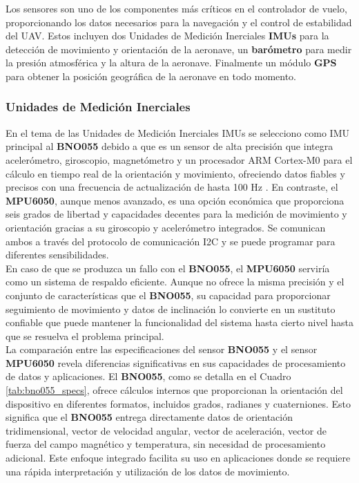     Los sensores son uno de los componentes más críticos en el controlador de vuelo, proporcionando los datos necesarios para la navegación y el control de estabilidad del UAV. Estos incluyen dos Unidades de Medición Inerciales \textbf{IMUs} para la detección de movimiento y orientación de la aeronave, un \textbf{barómetro} para medir la presión atmosférica y la altura de la aeronave. Finalmente un módulo \textbf{GPS} para obtener la posición geográfica de la aeronave en todo momento. 


    \subsubsection{ Unidades de Medición Inerciales}
        En el tema de las Unidades de Medición Inerciales IMUs se selecciono como IMU principal al \textbf{BNO055} debido a que es un sensor de alta precisión que integra acelerómetro, giroscopio, magnetómetro y un procesador ARM Cortex-M0 para el cálculo en tiempo real de la orientación y movimiento, ofreciendo datos fiables y precisos con una frecuencia de actualización de hasta 100 Hz \cite{IMU}. En contraste, el \textbf{MPU6050}, aunque menos avanzado, es una opción económica que proporciona seis grados de libertad y capacidades decentes para la medición de movimiento y orientación gracias a su giroscopio y acelerómetro integrados. Se comunican ambos a través del protocolo de comunicación I2C y se puede programar para diferentes sensibilidades.\cite{BNO} \\ 
        
        
        
        En caso de que se produzca un fallo con el \textbf{BNO055}, el \textbf{MPU6050} serviría como un sistema de respaldo eficiente. Aunque no ofrece la misma precisión y el conjunto de características que el \textbf{BNO055}, su capacidad para proporcionar seguimiento de movimiento y datos de inclinación lo convierte en un sustituto confiable que puede mantener la funcionalidad del sistema hasta cierto nivel hasta que se resuelva el problema principal. \\ 

        La comparación entre las especificaciones del sensor \textbf{BNO055} y el sensor \textbf{MPU6050} revela diferencias significativas en sus capacidades de procesamiento de datos y aplicaciones. El \textbf{BNO055}, como se detalla en el Cuadro \ref{tab:bno055_specs}, ofrece cálculos internos que proporcionan la orientación del dispositivo en diferentes formatos, incluidos grados, radianes y cuaterniones. Esto significa que el \textbf{BNO055} entrega directamente datos de orientación tridimensional, vector de velocidad angular, vector de aceleración, vector de fuerza del campo magnético y temperatura, sin necesidad de procesamiento adicional. Este enfoque integrado facilita su uso en aplicaciones donde se requiere una rápida interpretación y utilización de los datos de movimiento.  \\ 
        
